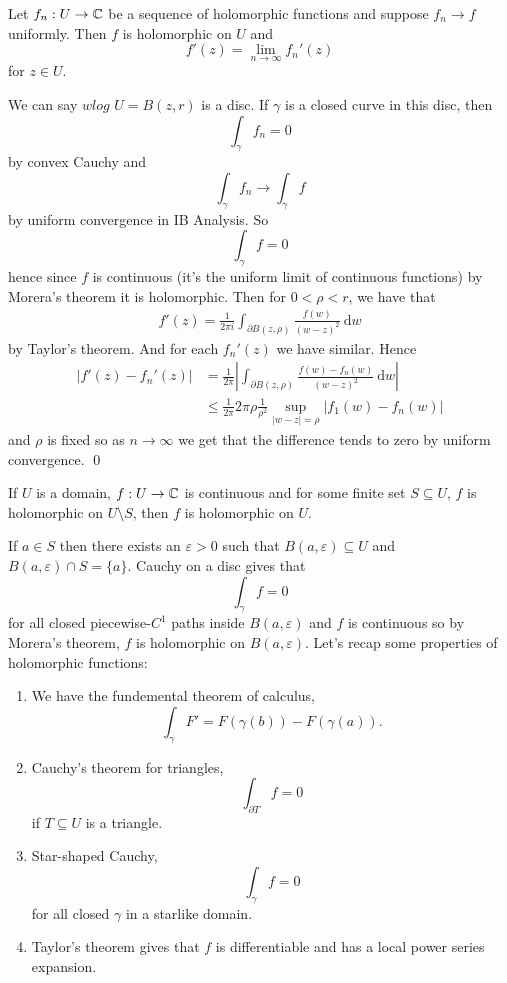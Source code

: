 \documentclass{article}
\begin{document}
\begin{corollary}
  Let $ f_n:U\to \mathbb{C} $ be a sequence of holomorphic functions and suppose $ f_n\to f $ uniformly. Then $ f $ is holomorphic on $ U $ and
  \[
	  f'(z) = \lim_{n\to \infty} f_n'(z)
  \]
  for $ z\in U $.
\end{corollary}
\pf We can say $ \textit{wlog} $ $ U=B(z,r) $ is a disc. If $ \gamma $ is a closed curve in this disc, then
\[
  \int_\gamma f_n = 0
\]
by convex Cauchy and
\[
  \int_\gamma f_n \to \int_\gamma f
\]
by uniform convergence in IB Analysis. So
\[
  \int_\gamma f = 0
\]
hence since $ f $ is continuous (it's the uniform limit of continuous functions) by Morera's theorem it is holomorphic. Then for $ 0<\rho <r $, we have that
\begin{align*}
	f'(z) = \frac 1{2\pi i} \int_{\partial B(z,\rho)} \frac{f(w)}{(w-z)^2}  \ \mathrm dw
\end{align*}
by Taylor's theorem. And for each $ f_n'(z) $ we have similar. Hence
\begin{align*}
	|f'(z) - f_n'(z)| &= \frac 1{2\pi} \left|\int_{\partial B(z,\rho)} \frac{f(w) - f_n(w)}{(w-z)^2}\ \mathrm dw\right|\\
			  &\le \frac 1{2\pi} 2\pi \rho \frac 1{\rho^2}\sup_{|w-z|= \rho} |f_1(w)-f_n(w)|
\end{align*}
and $ \rho $ is fixed so as $ n\to \infty $ we get that the difference tends to zero by uniform convergence. \qed
\begin{corollary}
  If $ U $ is a domain, $ f:U\to \mathbb{C} $ is continuous and for some finite set $ S\subseteq U $, $ f $ is holomorphic on $ U\setminus S $, then $ f $ is holomorphic on $ U $.
\end{corollary}
\pf If $ a\in S $ then there exists an $ \varepsilon>0 $ such that $ B(a,\varepsilon)\subseteq U $ and $ B(a,\varepsilon)\cap S = \{a\} $. Cauchy on a disc gives that
\[
  \int_\gamma f = 0
\]
for all closed piecewise-$ C^1 $ paths inside $ B(a,\varepsilon) $ and $ f $ is continuous so by Morera's theorem, $ f $ is holomorphic on $ B(a,\varepsilon) $.
Let's recap some properties of holomorphic functions:
\begin{enumerate}
	\item We have the fundemental theorem of calculus,
		\[
		  \int_\gamma F' = F(\gamma(b)) - F(\gamma(a)).
		\]
	\item Cauchy's theorem for triangles,
		\[
			\int_{\partial T} f = 0
		\]
		if $ T\subseteq U $ is a triangle.
	\item Star-shaped Cauchy, 
		\[
		  \int_\gamma f = 0
		\]
		for all closed $ \gamma $ in a starlike domain.
	\item Taylor's theorem gives that $ f $ is differentiable and has a local power series expansion.
\end{enumerate}
\end{document}

